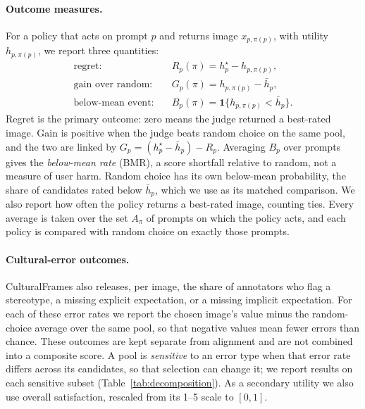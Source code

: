 \documentclass[letterpaper]{article}
\begin{document}
\paragraph{Outcome measures.} For a policy that acts on prompt $p$ and returns image $x_{p,\pi(p)}$, with utility $h_{p,\pi(p)}$, we report three quantities:
\begin{align}
\text{regret:}\quad & R_p(\pi)=h^\star_p-h_{p,\pi(p)}, \label{eq:regret}\\
\text{gain over random:}\quad & G_p(\pi)=h_{p,\pi(p)}-\bar h_p, \label{eq:gain}\\
\text{below-mean event:}\quad & B_p(\pi)=\mathbf{1}\{h_{p,\pi(p)}<\bar h_p\}. \label{eq:bmr}
\end{align}
Regret is the primary outcome: zero means the judge returned a best-rated image. Gain is positive when the judge beats random choice on the same pool, and the two are linked by $G_p=(h^\star_p-\bar h_p)-R_p$. Averaging $B_p$ over prompts gives the \emph{below-mean rate} (BMR), a score shortfall relative to random, not a measure of user harm. Random choice has its own below-mean probability, the share of candidates rated below $\bar h_p$, which we use as its matched comparison. We also report how often the policy returns a best-rated image, counting ties. Every average is taken over the set $A_\pi$ of prompts on which the policy acts, and each policy is compared with random choice on exactly those prompts.

\paragraph{Cultural-error outcomes.} CulturalFrames also releases, per image, the share of annotators who flag a stereotype, a missing explicit expectation, or a missing implicit expectation. For each of these error rates we report the chosen image's value minus the random-choice average over the same pool, so that negative values mean fewer errors than chance. These outcomes are kept separate from alignment and are not combined into a composite score. A pool is \emph{sensitive} to an error type when that error rate differs across its candidates, so that selection can change it; we report results on each sensitive subset (Table~\ref{tab:decomposition}). As a secondary utility we also use overall satisfaction, rescaled from its 1--5 scale to $[0,1]$.
\end{document}
